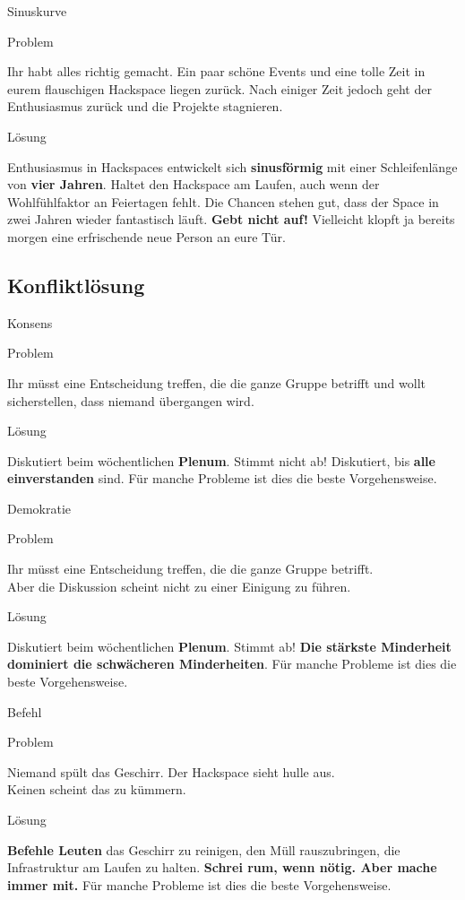 \documentclass[aspectratio=1610]{beamer}
\newcommand{\pattern}[2]{
  \begin{alertblock}{Problem}
    #1
  \end{alertblock}
  \pause
  \begin{exampleblock}{Lösung}
    #2
  \end{exampleblock}
}
\begin{document}
  \begin{frame}{Sinuskurve}
    \pattern{
      Ihr habt alles richtig gemacht. Ein paar schöne Events und eine tolle
      Zeit in eurem flauschigen Hackspace liegen zurück. Nach einiger Zeit
      jedoch geht der Enthusiasmus zurück und die Projekte stagnieren.
    }{
      Enthusiasmus in Hackspaces entwickelt sich \textbf{sinusförmig} mit einer
      Schleifenlänge von \textbf{vier Jahren}. Haltet den Hackspace am Laufen,
      auch wenn der Wohlfühlfaktor an Feiertagen fehlt. Die Chancen stehen gut,
      dass der Space in zwei Jahren wieder fantastisch läuft. \textbf{Gebt nicht
      auf!} Vielleicht klopft ja bereits morgen eine erfrischende neue Person
      an eure Tür.
    }
  \end{frame}

  \subsection{Konfliktlösung}

  \begin{frame}{Konsens}
    \pattern{
      Ihr müsst eine Entscheidung treffen, die die ganze Gruppe betrifft und
      wollt sicherstellen, dass niemand übergangen wird.
    }{
      Diskutiert beim wöchentlichen \textbf{Plenum}. Stimmt nicht ab!
      Diskutiert, bis \textbf{alle einverstanden} sind. Für manche Probleme ist
      dies die beste Vorgehensweise.
    }
  \end{frame}

  \begin{frame}{Demokratie}
    \pattern{
      Ihr müsst eine Entscheidung treffen, die die ganze Gruppe betrifft.\\
      Aber die Diskussion scheint nicht zu einer Einigung zu führen.
    }{
      Diskutiert beim wöchentlichen \textbf{Plenum}. Stimmt ab!
      \textbf{Die stärkste Minderheit dominiert die schwächeren Minderheiten}.
      Für manche Probleme ist dies die beste Vorgehensweise.
    }
  \end{frame}

  \begin{frame}{Befehl}
    \pattern{
      Niemand spült das Geschirr. Der Hackspace sieht hulle aus.\\
      Keinen scheint das zu kümmern.
    }{
      \textbf{Befehle Leuten} das Geschirr zu reinigen, den Müll rauszubringen,
      die Infrastruktur am Laufen zu halten. \textbf{Schrei rum, wenn nötig.
      Aber mache immer mit.} Für manche Probleme ist dies die beste
      Vorgehensweise.
    }
  \end{frame}
\end{document}
